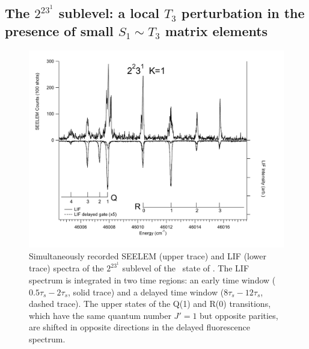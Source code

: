\subsection{The $2^23^1$  sublevel: a local $T_3$
  perturbation in the presence of small $S_1 \sim T_3$ matrix
  elements}



\begin{figure}
  \caption{Simultaneously recorded SEELEM (upper trace) and LIF (lower
    trace) spectra of the $2^23^1$  sublevel of the \astate\
    state of .  The LIF spectrum is integrated in two time
    regions: an early time window ($0.5\tau_s-2\tau_s$, solid trace)
    and a delayed time window ($8\tau_s-12\tau_s$, dashed trace).  The
    upper states of the Q(1) and R(0) transitions, which have the same
    quantum number $J'=1$ but opposite parities, are shifted in
    opposite directions in the delayed fluorescence spectrum.}
  \label{fig:spectrum-2231}
  \centering
  \vspace{1cm}
  \includegraphics[width=7in,angle=90]{spectrum-2231-q4r3.pdf}
\end{figure}

